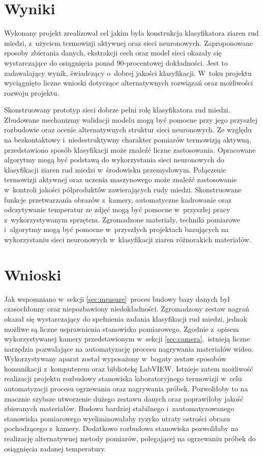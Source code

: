 \section{Wyniki}
Wykonany projekt zrealizował cel jakim była konstrukcja klasyfikatora ziaren rud
miedzi, z~użyciem termowizji aktywnej oraz sieci neuronowych.
Zaproponowane sposoby zbierania danych, ekstrakcji cech oraz model sieci okazały
się wystarczające do osiągnięcia ponad 90-procentowej
dokładności.
Jest to zadawalający wynik, świadczący o~dobrej jakości klasyfikacji.
W~toku projektu wyciągnięto liczne wnioski dotyczące alternatywnych rozwiązań
oraz możliwości rozwoju projektu.

Skonstruowany prototyp sieci dobrze pełni rolę klasyfikatora rud miedzi.
Zbudowane mechanizmy walidacji modelu mogą być pomocne przy jego przyszłej
rozbudowie oraz ocenie alternatywnych struktur sieci neuronowych.
Ze względu na bezkontaktowy i~niedestruktywny charakter pomiarów termowizją
aktywną, przedstawiono sposób klasyfikacji może znaleźć liczne zastosowania.
Opracowane algorytmy mogą być podstawą do wykorzystania sieci neuronowych do
klasyfikacji ziaren rud miedzi w~środowisku przemysłowym.
Połączenie termowizji aktywnej oraz uczenia maszynowego może znaleźć
zastosowanie w~kontroli jakości półproduktów zawierających rudy miedzi.
Skonstruowane funkcje przetwarzania obrazów z~kamery, automatyczne kadrowanie
oraz odczytywanie temperatur ze zdjęć mogą być pomocne w~przyszłej pracy
z~wykorzystywanym sprzętem.
Zgromadzone materiały, techniki pomiarowe i~algorytmy mogą być pomocne
w~przyszłych projektach bazujących na wykorzystaniu sieci neuronowych
w~klasyfikacji ziaren różnorakich materiałów.

\section{Wnioski}
Jak wspomniano w~sekcji \ref{sec:measure}~proces budowy bazy danych był
czasochłonny oraz niepozbawiony niedokładności.
Zgromadzony zestaw nagrań okazał się wystarczający do spełnienia zadania
klasyfikacji rud miedzi, jednak możliwe są liczne usprawnienia stanowiska
pomiarowego.
Zgodnie z~opisem wykorzystywanej kamery przedstawionym w~sekcji
\ref{sec:camera},~istnieją liczne narzędzia pozwalające na automatyzację
procesu nagrywania materiałów wideo.
Wykorzystywany aparat został wyposażony w~bogaty zestaw sposobów komunikacji
z~komputerem oraz bibliotekę LabVIEW.
Istnieje zatem możliwość realizacji projektu rozbudowy stanowiska
laboratoryjnego termowizji w~celu automatyzacji procesu ogrzewania oraz
nagrywania próbek.
Pozwoliłoby to na znacznie szybsze utworzenie dużego zestawu danych oraz
poprawiłoby jakość zbieranych materiałów.
Budowa bardziej stabilnego i~zautomatyzowanego stanowiska pomiarowego
wyeliminowałaby ryzyko utraty ostrości obrazu pochodzącego z~kamery.
Dodatkowo rozbudowa stanowiska pozwoliłaby na realizację alternatywnej
metody pomiarów, polegającej na ogrzewaniu próbek do osiągnięcia zadanej
temperatury.

